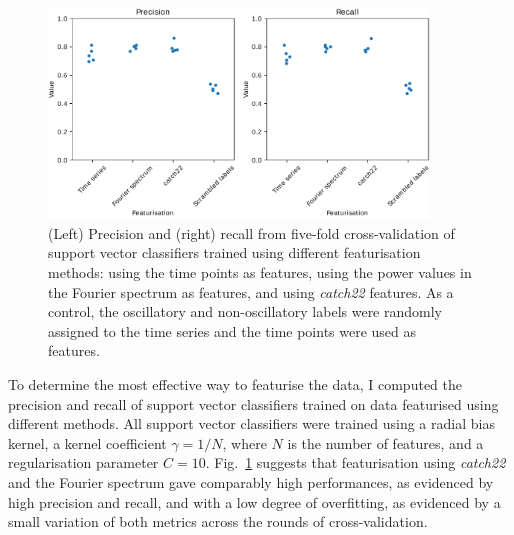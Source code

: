 \begin{figure}
  \centering
  \includegraphics[width=0.9\textwidth]{svm_feat_compare_edit.pdf}
  \caption[
    Precision and recall from five-fold cross-validation of support vector classifiers trained using different featurisation methods.
  ]{
    (Left) Precision and (right) recall from five-fold cross-validation of support vector classifiers trained using different featurisation methods:
    using the time points as features,
    using the power values in the Fourier spectrum as features,
    and using \emph{catch22} features.
    As a control, the oscillatory and non-oscillatory labels were randomly assigned to the time series and the time points were used as features.
  }
  \label{fig:analysis-precision-recall}
\end{figure}


To determine the most effective way to featurise the data, I computed the precision and recall of support vector classifiers trained on data featurised using different methods.
All support vector classifiers were trained using a radial bias kernel, a kernel coefficient $\gamma = 1/N$, where $N$ is the number of features, and a regularisation parameter $C = 10$.
Fig.\ \ref{fig:analysis-precision-recall} suggests that featurisation using \textit{catch22} and the Fourier spectrum gave comparably high performances, as evidenced by high precision and recall, and with a low degree of overfitting, as evidenced by a small variation of both metrics across the rounds of cross-validation.


